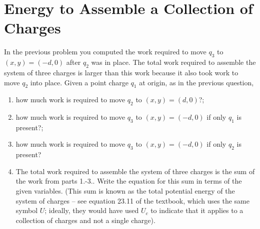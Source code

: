 \documentclass{article}
\begin{document}
\section{Energy to Assemble a Collection of Charges}

In the previous problem you computed the work required to move $q_3$ to $(x,y) = (-d,0)$ after $q_2$ was in place. The total work required to assemble the system of three charges is larger than this work because it also took work to move $q_2$ into place. Given a point charge $q_1$ at origin, as in the previous question,

\begin{enumerate}

  \item how much work is required to move $q_2$ to $(x,y) = (d,0)$?;

        \ifsolutions
          
        \else
          \vskip 36pt
        \fi

  \item how much work is required to move $q_3$ to $(x,y) = (-d,0)$ if only $q_1$ is present?;

        \ifsolutions
          
        \else
          \vskip 36pt
        \fi

  \item how much work is required to move $q_3$ to $(x,y) = (-d,0)$ if only $q_2$ is present?

        \ifsolutions
          
        \else
          \vskip 36pt
        \fi

  \item The total work required to assemble the system of three charges is the sum of the work from parts 1.-3.. Write the equation for this sum in terms of the given variables. (This sum is known as the total potential energy of the system of charges -- see equation 23.11 of the textbook, which uses the same symbol $U$; ideally, they would have used $U_c$ to indicate that it applies to a collection of charges and not a single charge).

\end{enumerate}
\end{document}
